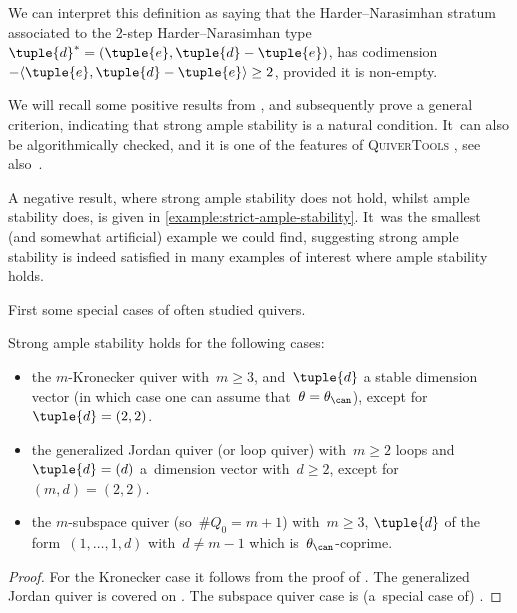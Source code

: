 \begin{remark}
We can interpret this definition as saying that
the Harder--Nara\-sim\-han stratum
associated to the 2-step Harder--Nara\-sim\-han type~$\tuple{d}^*=(\tuple{e},\tuple{d}-\tuple{e})$,
has codimension $-\langle \tuple{e}, \tuple{d} - \tuple{e} \rangle\geq 2$,
provided it is non-empty.
\end{remark}

We will recall some positive results from \cite{MR3683503,karen},
and subsequently prove a general criterion,
indicating that strong ample stability is a natural condition. It~can also be algorithmically checked,
and it is one of the features of \textsc{QuiverTools} \cite{quivertools},
see also~\cite{2506.19432}.

A negative result,
where strong ample stability does not hold,
whilst ample stability does,
is given in \cref{example:strict-ample-stability}. It~was the smallest
(and somewhat artificial) example
we could find,
suggesting strong ample stability is indeed satisfied in many examples of interest
where ample stability holds.

First some special cases of often studied quivers.
\begin{lemma}
\label{lemma:strong-ample-stability-examples}
Strong ample stability holds for the following cases:
\begin{itemize}
\item the $m$-Kronecker quiver with~$m\geq 3$,
and~$\tuple{d}$ a stable dimension vector
(in which case one can assume that~$\theta=\theta_\can$),
except for~$\tuple{d}=(2,2)$.
\item the generalized Jordan quiver (or loop quiver)
with~$m\geq 2$ loops
and~$\tuple{d}=(d)$ a~dimension vector with~$d\geq 2$,
except for~$(m,d)=(2,2)$.
\item the $m$-subspace quiver (so~$\#Q_0=m+1$) with~$m\geq 3$,
$\tuple{d}$ of the form~$(1,\ldots,1,d)$ with~$d\neq m-1$
which is~$\theta_\can$-coprime.
\end{itemize}
\end{lemma}

\begin{proof}
For the Kronecker case it follows from the proof of \cite[Prop.\,6.2]{MR3683503}.
The generalized Jordan quiver is covered on \cite[p.\,460]{MR3683503}.
The subspace quiver case is (a~special case of) \cite[Th.\,3.3.4]{karen}.
\end{proof}


